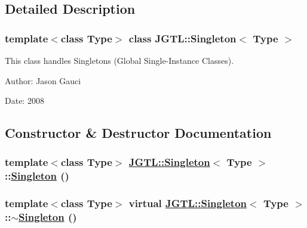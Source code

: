 \subsection{Detailed Description}
\subsubsection*{template$<$class Type$>$ class JGTL::Singleton$<$ Type $>$}

This class handles Singletons (Global Single-Instance Classes). 

\begin{Desc}
\item[Author:]Jason Gauci \end{Desc}
\begin{Desc}
\item[Date:]2008 \end{Desc}




\subsection{Constructor \& Destructor Documentation}
\hypertarget{class_j_g_t_l_1_1_singleton_c7877acab4b56ed562f642e040247c7a}{
\subsubsection[Singleton]{\setlength{\rightskip}{0pt plus 5cm}template$<$class Type$>$ \hyperlink{class_j_g_t_l_1_1_singleton}{JGTL::Singleton}$<$ Type $>$::\hyperlink{class_j_g_t_l_1_1_singleton}{Singleton} ()}}
\label{class_j_g_t_l_1_1_singleton_c7877acab4b56ed562f642e040247c7a}


\hypertarget{class_j_g_t_l_1_1_singleton_44f0141a9d7e4931361ea08186c65300}{
\subsubsection[$\sim$Singleton]{\setlength{\rightskip}{0pt plus 5cm}template$<$class Type$>$ virtual \hyperlink{class_j_g_t_l_1_1_singleton}{JGTL::Singleton}$<$ Type $>$::$\sim$\hyperlink{class_j_g_t_l_1_1_singleton}{Singleton} ()}}
\label{class_j_g_t_l_1_1_singleton_44f0141a9d7e4931361ea08186c65300}




